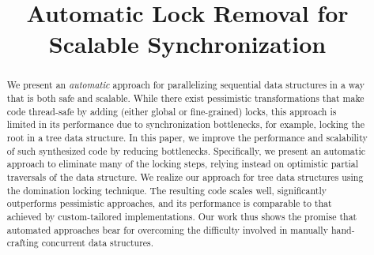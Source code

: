 \documentclass[pldi]{sigplanconf-pldi15}
\begin{document}






\title{Automatic Lock Removal for Scalable Synchronization}

\authorinfo{}
           {}
           {}

\maketitle

\begin{abstract}
We present an \emph{automatic} approach for parallelizing sequential 
data structures in a way that is both safe and scalable. 
While there exist pessimistic transformations that make 
code thread-safe by adding (either global or fine-grained) locks, 
this approach is limited in its performance due to synchronization 
bottlenecks, for example, locking the root in a tree data structure. 
In this paper, we improve the performance and scalability of such 
synthesized code by reducing bottlenecks. Specifically, 
we present an automatic approach to eliminate many of the locking steps, 
relying instead on optimistic partial traversals of the data structure. 
We realize our approach for tree data structures using 
the domination locking technique. 
The resulting code scales well, significantly outperforms 
pessimistic approaches, and its performance is comparable 
to that achieved by custom-tailored implementations. 
Our work thus shows the promise that automated approaches 
bear for overcoming the difficulty involved in manually 
hand-crafting concurrent data structures. 

\end{abstract}
\end{document}
